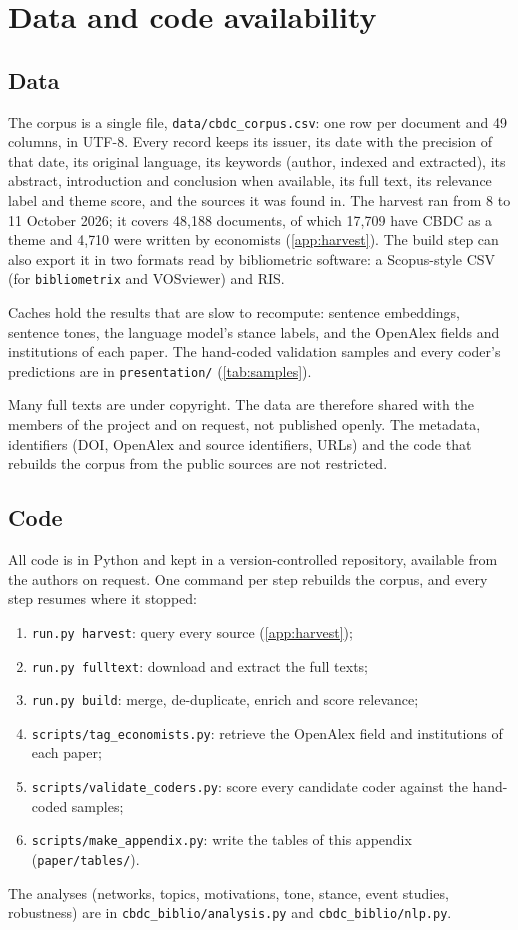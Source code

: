 \documentclass[11pt,a4paper]{article}
\begin{document}



\section{Data and code availability}\label{app:data}

\subsection{Data}
The corpus is a single file, \texttt{data/cbdc\_corpus.csv}: one row per document and 49 columns, in UTF-8. Every record keeps its issuer, its date with the precision of that date, its original language, its keywords (author, indexed and extracted), its abstract, introduction and conclusion when available, its full text, its relevance label and theme score, and the sources it was found in. The harvest ran from 8 to 11 October 2026; it covers 48{,}188 documents, of which 17{,}709 have CBDC as a theme and 4{,}710 were written by economists (\cref{app:harvest}). The build step can also export it in two formats read by bibliometric software: a Scopus-style CSV (for \texttt{bibliometrix} and VOSviewer) and RIS.

Caches hold the results that are slow to recompute: sentence embeddings, sentence tones, the language model's stance labels, and the OpenAlex fields and institutions of each paper. The hand-coded validation samples and every coder's predictions are in \texttt{presentation/} (\cref{tab:samples}).

Many full texts are under copyright. The data are therefore shared with the members of the project and on request, not published openly. The metadata, identifiers (DOI, OpenAlex and source identifiers, URLs) and the code that rebuilds the corpus from the public sources are not restricted.

\subsection{Code}
All code is in Python and kept in a version-controlled repository, available from the authors on request. One command per step rebuilds the corpus, and every step resumes where it stopped:
\begin{enumerate}
\item \texttt{run.py harvest}: query every source (\cref{app:harvest});
\item \texttt{run.py fulltext}: download and extract the full texts;
\item \texttt{run.py build}: merge, de-duplicate, enrich and score relevance;
\item \texttt{scripts/tag\_economists.py}: retrieve the OpenAlex field and institutions of each paper;
\item \texttt{scripts/validate\_coders.py}: score every candidate coder against the hand-coded samples;
\item \texttt{scripts/make\_appendix.py}: write the tables of this appendix (\texttt{paper/tables/}).
\end{enumerate}
The analyses (networks, topics, motivations, tone, stance, event studies, robustness) are in \texttt{cbdc\_biblio/analysis.py} and \texttt{cbdc\_biblio/nlp.py}.
\end{document}

